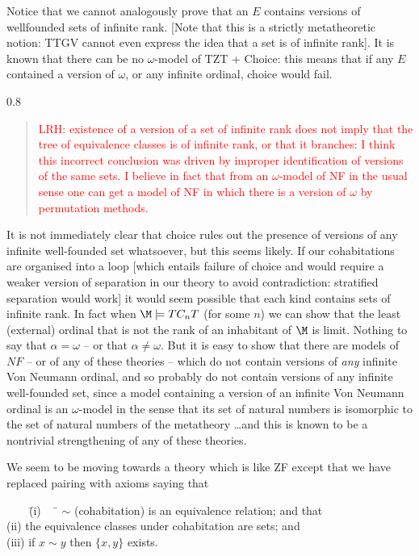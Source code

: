 \documentclass[12pt]{article}
\renewcommand{\smallpara}[1]{\begin{footnotesize}\begin{spacing}{0.8}\begin{quote} #1  \end{quote}\end{spacing}\end{footnotesize}}
\begin{document}
{Notice that we cannot analogously prove that an $E$ contains
versions of wellfounded sets of infinite rank.  [Note that this is a strictly metatheoretic notion:  TTGV cannot even express the idea that a set is of infinite rank].   It is known that there can be no $\omega$-model of TZT + Choice:  this means that if any $E$ contained a version of $\omega$, or any infinite ordinal, choice would fail.  \smallpara{\textcolor{red}{LRH:  existence of a version of a set of infinite rank does not imply that the tree of equivalence classes is of infinite rank, or that it branches:  I think this incorrect conclusion was driven by improper identification of versions of the same sets.  I believe in fact that from an $\omega$-model of NF in the usual sense one can get a model of NF in which there is a version of $\omega$ by permutation methods.}}
 It is not immediately clear that choice rules out the presence of versions of any infinite well-founded set whatsoever, but this seems likely.  If our cohabitations are organised into
a loop [which entails failure of choice and would require a weaker version of separation in our theory to avoid contradiction:  stratified separation would work] it would seem possible that each kind contains sets of
infinite rank.  In fact when $\M\models TC_nT$ (for some $n$) 
we can show that the least (external) ordinal that is not the rank of an
inhabitant of $\M$ is limit.  Nothing to say that $\alpha = \omega$ --
or that $\alpha \not= \omega$.   But it is easy to show that there are models of $NF$ -- or of any of these theories -- which do not contain versions of {\sl any} infinite Von Neumann ordinal, and so probably do not contain versions of any infinite well-founded set, since a model containing a version of an infinite Von Neumann ordinal is an $\omega$-model in the sense that its set of natural numbers is isomorphic to the set of natural numbers of the metatheory \ldots and this is known to be a nontrivial strengthening of any of these theories.



We seem to be moving towards a theory which is like ZF except that we
have replaced pairing with axioms saying that 
\begin{tabbing}
\ \ \ \ \= (i)\ \ \ \=  $\sim$ (cohabitation) is an equivalence relation; and that \\
        \>(ii) \> the equivalence classes under cohabitation are sets; and\\
        \>(iii)\> if $x \sim y$ then $\{x,y\}$ exists. \end{tabbing}

}
\end{document}
